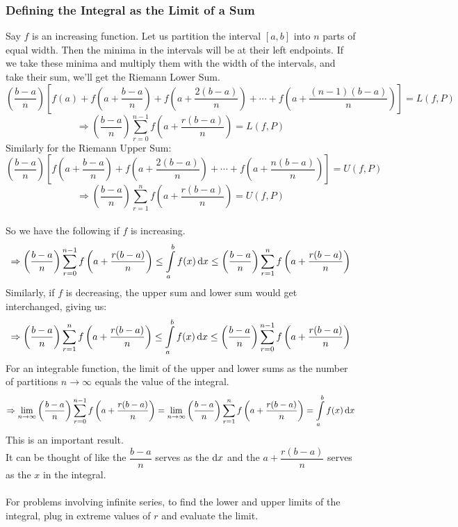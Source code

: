 \documentclass[14]{article}
\theoremstyle{definition}
\theoremstyle{case}
\begin{document}
\subsubsection{Defining the Integral as the Limit of a Sum}
Say $f$ is an increasing function. Let us partition the interval $[a, b]$ into $n$ parts of equal width. Then the minima in the intervals will be at their left endpoints. If we take these minima and multiply them with the width of the intervals, and take their sum, we'll get the Riemann Lower Sum.
\[ \left( \dfrac{b-a}{n} \right)\left[f(a)  + f\left(a + \dfrac{b-a}{n} \right) + f\left(a + \dfrac{2(b-a)}{n}\right) + \cdots + f\left(a + \dfrac{(n-1)(b-a)}{n} \right)\right] = L(f, P)\]
\[\Rightarrow \left( \dfrac{b-a}{n} \right) \sum\limits_{r=0}^{n-1} f\left( a + \dfrac{r(b-a)}{n} \right) = L(f, P)\]
Similarly for the Riemann Upper Sum:
\[\left( \dfrac{b-a}{n} \right) \left[ f\left( a + \dfrac{b-a}{n} \right) + f\left(a + \dfrac{2(b-a)}{n} \right) + \cdots + f\left(a + \dfrac{n(b-a)}{n} \right) \right] = U(f, P)\]
\[\Rightarrow \left( \dfrac{b-a}{n} \right) \sum\limits_{r=1}^n f\left( a + \dfrac{r(b-a)}{n} \right) = U(f, P)\]
\pagebreak
\text{}\\
So we have the following if $f$ is increasing.
\[\Rightarrow \left( \dfrac{b-a}{n} \right) \sum\limits_{r=0}^{n-1} f\left( a + \dfrac{r(b-a)}{n} \right) \leq \int\limits_a^b f(x) \dif x \leq \left( \dfrac{b-a}{n} \right) \sum\limits_{r=1}^n f\left( a + \dfrac{r(b-a)}{n} \right)\]
Similarly, if $f$ is decreasing, the upper sum and lower sum would get interchanged, giving us:
\[\Rightarrow \left( \dfrac{b-a}{n} \right) \sum\limits_{r=1}^n f\left( a + \dfrac{r(b-a)}{n} \right) \leq \int\limits_a^b f(x) \dif x \leq \left( \dfrac{b-a}{n} \right) \sum\limits_{r=0}^{n-1} f\left( a + \dfrac{r(b-a)}{n} \right) \]
For an integrable function, the limit of the upper and lower sums as the number of partitions $n \to \infty$ equals the value of the integral.
\[\Rightarrow \lim\limits_{n \to \infty} \left( \dfrac{b-a}{n} \right) \sum\limits_{r=0}^{n-1} f\left( a + \dfrac{r(b-a)}{n} \right) = \lim\limits_{n \to \infty} \left( \dfrac{b-a}{n} \right) \sum\limits_{r=1}^n f\left( a + \dfrac{r(b-a)}{n} \right) = \int\limits_a^b f(x) \dif x\]
This is an important result.\\
It can be thought of like the $\dfrac{b-a}{n}$ serves as the $\dif x$ and the $a + \dfrac{r(b-a)}{n}$ serves as the $x$ in the integral.\\\\
For problems involving infinite series, to find the lower and upper limits of the integral, plug in extreme values of $r$ and evaluate the limit.\\
\end{document}
